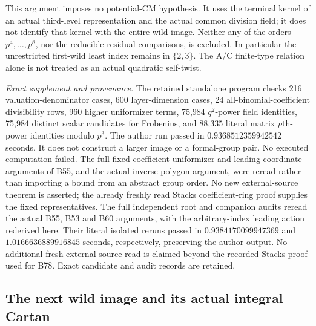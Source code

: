 \begin{remark}
\label{rem:B-RD79-scope}
This argument imposes no potential-CM hypothesis. It uses the
terminal kernel of an actual third-level representation and
the actual common division field; it does not identify that
kernel with the entire wild image. Neither any of the orders
\(p^4,\ldots,p^8\), nor the reducible-residual comparisons, is
excluded. In particular the unrestricted first-wild least
index remains in \(\{2,3\}\). The A/C finite-type relation alone
is not treated as an actual quadratic self-twist.


\smallskip
\noindent\emph{Exact supplement and provenance.}
The retained standalone program
checks 216 valuation-denominator cases, 600 layer-dimension
cases, 24 all-binomial-coefficient divisibility rows, 960
higher uniformizer terms, 75,984 \(q^2\)-power field identities,
75,984 distinct scalar candidates for Frobenius, and 88,335
literal matrix \(p\)th-power identities modulo \(p^3\).
The author run passed in \(0.9368512359942542\) seconds.
It does not construct a larger image or a formal-group pair.
No executed computation failed. The full fixed-coefficient
uniformizer and leading-coordinate arguments of B55, and the
actual inverse-polygon argument, were reread rather than
importing a bound from an abstract group order. No new
external-source theorem is asserted; the already freshly read
Stacks coefficient-ring proof supplies the fixed representatives.
The full independent root and companion audits reread the actual
B55, B53 and B60 arguments, with the arbitrary-index leading
action rederived here. Their literal isolated reruns passed in
\(0.9384170099947369\) and \(1.0166636889916845\) seconds,
respectively, preserving the author output. No additional fresh
external-source read is claimed beyond the recorded Stacks
proof used for B78. Exact candidate and audit records are retained.
\end{remark}


\subsection{The next wild image and its actual integral Cartan}

